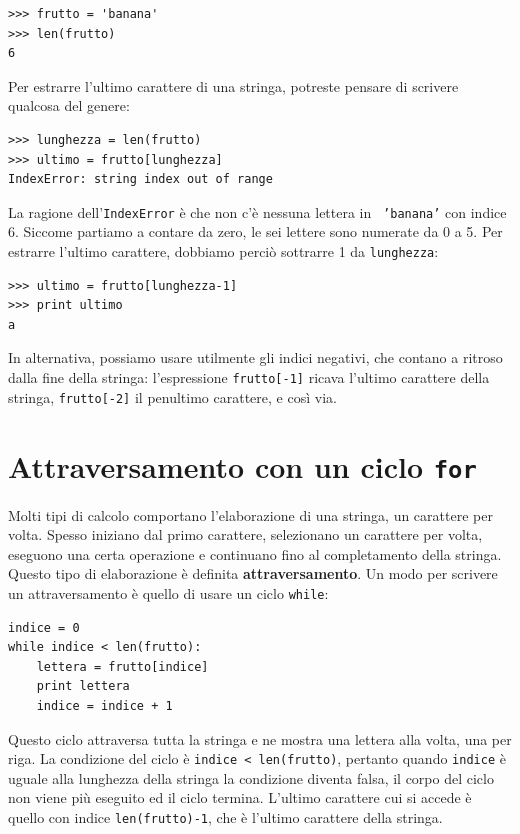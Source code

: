 \documentclass[10pt]{book}
\begin{document}
\begin{verbatim}
>>> frutto = 'banana'
>>> len(frutto)
6
\end{verbatim}
%
Per estrarre l'ultimo carattere di una stringa, potreste pensare di scrivere qualcosa del genere:

\begin{verbatim}
>>> lunghezza = len(frutto)
>>> ultimo = frutto[lunghezza]
IndexError: string index out of range
\end{verbatim}
%
La ragione dell'{\tt IndexError} è che non c'è nessuna lettera in {\tt
'banana'} con indice 6. Siccome partiamo a contare da zero, le sei lettere sono numerate da 0 a 5. Per estrarre l'ultimo carattere, dobbiamo perciò sottrarre 1 da {\tt lunghezza}:

\begin{verbatim}
>>> ultimo = frutto[lunghezza-1]
>>> print ultimo
a
\end{verbatim}
%
In alternativa, possiamo usare utilmente gli indici negativi, che contano a ritroso dalla fine della stringa: l'espressione {\tt frutto[-1]} ricava l'ultimo carattere della stringa, {\tt frutto[-2]} il penultimo carattere, e così via.


\section{Attraversamento con un ciclo {\tt for}}
\label{for}

Molti tipi di calcolo comportano l'elaborazione di una stringa, un carattere per volta. Spesso iniziano dal primo carattere, selezionano un carattere per volta, eseguono una certa operazione e continuano fino al completamento della stringa. Questo tipo di elaborazione è definita {\bf attraversamento}. Un modo per scrivere un attraversamento è quello di usare un ciclo {\tt while}:

\begin{verbatim}
indice = 0
while indice < len(frutto):
    lettera = frutto[indice]
    print lettera
    indice = indice + 1
\end{verbatim}
%
Questo ciclo attraversa tutta la stringa e ne mostra una lettera alla volta,    una per riga. La condizione del ciclo è {\tt indice < len(frutto)}, pertanto   quando {\tt indice} è uguale alla lunghezza della stringa la condizione diventa falsa, il corpo del ciclo non viene più eseguito ed il ciclo termina. L'ultimo carattere cui si accede è quello con indice {\tt len(frutto)-1}, che è l'ultimo carattere della stringa.
\end{document}

